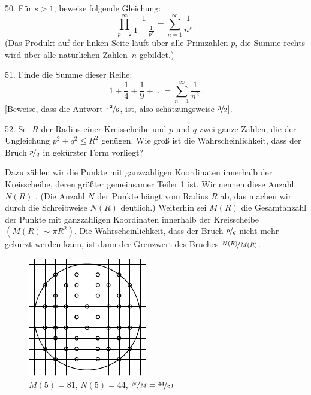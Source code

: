 \begin{problem}{50.}
	Für $s>1$, beweise folgende Gleichung:
	\begin{equation*}
		\textstyle\prod\limits_{p=2}^{\infty} \frac{1}{1-\frac{1}{p^s}}=\textstyle\sum\limits_{n=1}^{\infty} \frac{1}{n^s}.
	\end{equation*}
	(Das Produkt auf der linken Seite läuft über alle Primzahlen $p$, die Summe rechts wird über alle natürlichen Zahlen~$n$ gebildet.)
\end{problem}

\begin{problem}{51.}
	Finde die Summe dieser Reihe:
	\begin{equation*}
		1+ \frac{1}{4}+ \frac{1}{9}+\dots=\textstyle\sum\limits_{n=1}^{\infty} \frac{1}{n^2}.
	\end{equation*}
	[Beweise, dass die Antwort $\nicefrac{\pi^2}{6}$, ist, also schätzungsweise $\nicefrac{3}{2}$].
\end{problem}

\begin{problem}{52.}
	Sei $R$ der Radius einer Kreisscheibe und $p$ und $q$ zwei ganze Zahlen, die der Ungleichung $p^2+q^2 \leqslant R^2$ genügen. Wie groß ist die Wahrscheinlichkeit, dass der Bruch $\nicefrac{p}{q}$ in gekürzter Form vorliegt?
	
	Dazu zählen wir die Punkte mit ganzzahligen Koordinaten innerhalb der Kreis\-schei\-be, deren größter gemeinsamer Teiler 1 ist. Wir nennen diese Anzahl $N(R)$ . (Die Anzahl $N$ der Punkte hängt vom Radius $R$ ab, das machen wir durch die Schreibweise $N(R)$ deutlich.)  Weiterhin sei $M(R)$ die Gesamtanzahl der Punkte mit ganzzahligen Koordinaten innerhalb der Kreisscheibe $(M(R) \sim \pi R^2)$. Die Wahrscheinlichkeit, dass der Bruch $\nicefrac{p}{q}$ nicht mehr gekürzt werden kann, ist dann der Grenzwert des Bruches $\nicefrac{N(R)}{M(R)}$.
	\begin{figure}
		\includegraphics{resources/taskbook-36}\\
		\footnotesize $M(5)=81$, $N(5)=44$, $\nicefrac{N}{M} = \nicefrac{44}{81}$
	\end{figure}
\end{problem}

